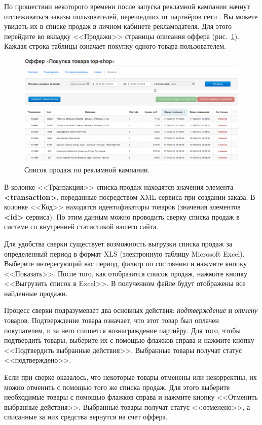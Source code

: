 \documentclass[a4paper,12pt]{article}
\begin{document}
По прошествии некоторого времени после запуска рекламной кампании начнут отслеживаться заказы пользователей, перешедших от партнёров сети \heymoose{}. Вы можете увидеть их в списке продаж в личном кабинете рекламодателя. Для этого перейдите во вкладку <<Продажи>> страницы описания оффера (рис.~\ref{fig:sales}). Каждая строка таблицы означает покупку одного товара пользователем.

\begin{figure}[!ht]
\centering
\includegraphics[width=\textwidth]{include/sales.png}
\caption{Список продаж по рекламной кампании.}
\label{fig:sales}
\end{figure}

В колонке <<Транзакция>> списка продаж находятся значения элемента \textbf{<transaction>}, переданные посредством XML-сервиса при создании заказа. В колонке <<Код>> находятся идентификаторы товаров (значения элементов \textbf{<id>} сервиса). По этим данным можно проводить сверку списка продаж в системе \heymoose{} со внутренней статистикой вашего сайта.

Для удобства сверки существует возможность выгрузки списка продаж за определенный период в формат XLS (электронную таблицу Microsoft Excel). Выберите интересующий вас период, фильтр по состоянию и нажмите кнопку <<Показать>>. После того, как отобразится список продаж, нажмите кнопку <<Выгрузить список в Excel>>. В полученном файле будут отображены все найденные продажи.

Процесс сверки подразумевает два основных действия: \textit{подтверждение} и \textit{отмену} товаров. Подтверждение товара означает, что этот товар был оплачен покупателем, и за него спишется вознаграждение партнёру. Для того, чтобы подтвердить товары, выберите их с помощью флажков справа и нажмите кнопку <<Подтвердить выбранные действия>>. Выбранные товары получат статус <<подтверждено>>.

Если при сверке оказалось, что некоторые товары отменены или некорректны, их можно отменить с помощью того же списка продаж. Для этого выберите необходимые товары с помощью флажков справа и нажмите кнопку <<Отменить выбранные действия>>. Выбранные товары получат статус <<отменено>>, а списанные за них средства вернутся на счет оффера.
\end{document}
